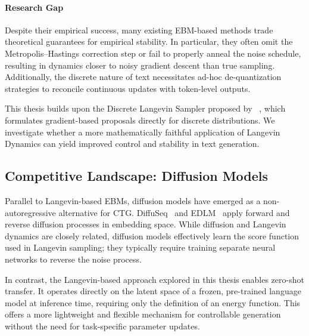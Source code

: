 \documentclass[11pt]{article}
\begin{document}
\paragraph{Research Gap}
Despite their empirical success, many existing EBM-based methods trade theoretical guarantees for empirical stability. In particular, they often omit the Metropolis--Hastings correction step or fail to properly anneal the noise schedule, resulting in dynamics closer to noisy gradient descent than true sampling. Additionally, the discrete nature of text necessitates ad-hoc de-quantization strategies to reconcile continuous updates with token-level outputs.

This thesis builds upon the Discrete Langevin Sampler proposed by ~\cite{zhang2022langevinlikesamplerdiscretedistributions}, which formulates gradient-based proposals directly for discrete distributions. We investigate whether a more mathematically faithful application of Langevin Dynamics can yield improved control and stability in text generation.

\subsection{Competitive Landscape: Diffusion Models}

Parallel to Langevin-based EBMs, diffusion models have emerged as a non-autoregressive alternative for CTG. DiffuSeq~\cite{gong2023diffuseqsequencesequencetext} and EDLM~\cite{ICLR2025_535baca3} apply forward and reverse diffusion processes in embedding space. While diffusion and Langevin dynamics are closely related, diffusion models effectively learn the score function used in Langevin sampling; they typically require training separate neural networks to reverse the noise process.

In contrast, the Langevin-based approach explored in this thesis enables zero-shot transfer. It operates directly on the latent space of a frozen, pre-trained language model at inference time, requiring only the definition of an energy function. This offers a more lightweight and flexible mechanism for controllable generation without the need for task-specific parameter updates.

 



\end{document}
